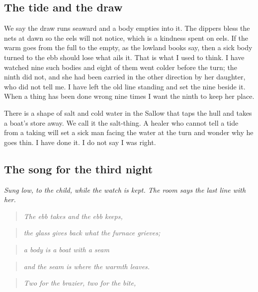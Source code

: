\documentclass{design/chronicle}
\begin{document}
\subsection*{The tide and the draw}

We say the draw runs seaward and a body empties into it. The dippers bless the nets at dawn so the eels will not notice, which is a kindness spent on eels. If the warm goes from the full to the empty, as the lowland books say, then a sick body turned to the ebb should lose what ails it. That is what I used to think. I have watched nine such bodies and eight of them went colder before the turn; the ninth did not, and she had been carried in the other direction by her daughter, who did not tell me. I have left the old line standing and set the nine beside it. When a thing has been done wrong nine times I want the ninth to keep her place.

There is a shape of salt and cold water in the Sallow that taps the hull and takes a boat’s store away. We call it the salt-thing. A healer who cannot tell a tide from a taking will set a sick man facing the water at the turn and wonder why he goes thin. I have done it. I do not say I was right.

\subsection*{The song for the third night}

\emph{Sung low, to the child, while the watch is kept. The room says the last line with her.}

\begin{quote}\itshape The ebb takes and the ebb keeps,\end{quote}

\begin{quote}\itshape the glass gives back what the furnace grieves;\end{quote}

\begin{quote}\itshape a body is a boat with a seam\end{quote}

\begin{quote}\itshape and the seam is where the warmth leaves.\end{quote}

\begin{quote}\itshape \end{quote}

\begin{quote}\itshape Two for the brazier, two for the bite,\end{quote}
\end{document}
